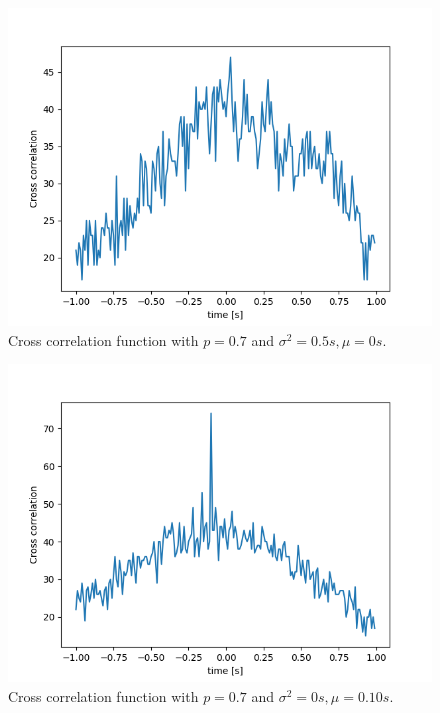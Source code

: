 \begin{figure}[H]
\centering
\includegraphics[scale=0.7]{2_b_p=0_7_50_0.png}
\caption{Cross correlation function with $p=0.7$ and $\sigma^2 = 0.5s, \mu = 0s$.}
\end{figure}

\begin{figure}[H]
\centering
\includegraphics[scale=0.7]{2_b_p=0_7_0_10.png}
\caption{Cross correlation function with $p=0.7$ and $\sigma^2 = 0s, \mu = 0.10s$.}
\end{figure}

